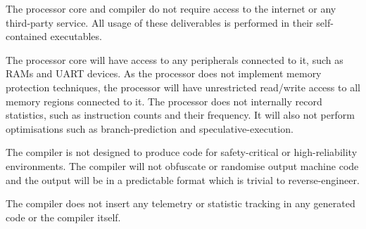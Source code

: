 The processor core and compiler do not require access to the internet or any third-party service. All usage of these deliverables is performed in their self-contained executables.

The processor core will have access to any peripherals connected to it, such as RAMs and UART devices. As the processor does not implement memory protection techniques, the processor will have unrestricted read/write access to all memory regions connected to it. The processor does not internally record statistics, such as instruction counts and their frequency. It will also not perform optimisations such as branch-prediction and speculative-execution.


The compiler is not designed to produce code for safety-critical or high-reliability environments. The compiler will not obfuscate or randomise output machine code and the output will be in a predictable format which is trivial to reverse-engineer.

The compiler does not insert any telemetry or statistic tracking in any generated code or the compiler itself.
